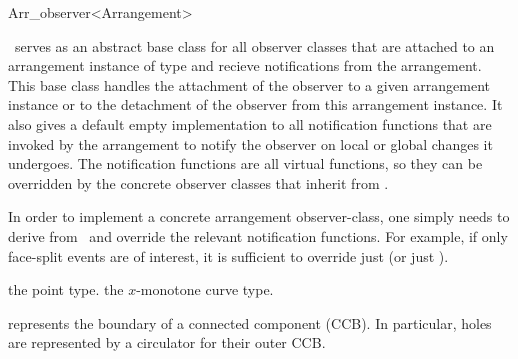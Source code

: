 
\ccRefPageBegin

\begin{ccRefClass}{Arr_observer<Arrangement>}
\label{arr_ref:arr_obs}

\ccDefinition

\ccClassTemplateName\ serves as an abstract base class for all observer
classes that are attached to an arrangement instance of type 
and recieve notifications from the arrangement.
This base class handles the attachment of the
observer to a given arrangement instance or to the detachment of the
observer from this arrangement instance. It also gives a default empty
implementation to all notification functions that are invoked by the
arrangement to notify the observer on local or global changes it undergoes.
The notification functions are all virtual functions, so they can be
overridden by the concrete observer classes that inherit from
\ccClassTemplateName.

In order to implement a concrete arrangement observer-class, one simply
needs to derive from \ccClassTemplateName\ and override the relevant
notification functions. For example, if only face-split events are of
interest, it is sufficient to override just  
(or just ).


\ccTypes


    {the point type.}
\ccGlue
{}
    {the $x$-monotone curve type.}

\ccGlue
{}
\ccGlue
{}
\ccGlue
{}
    {represents the boundary of a connected component (CCB).
     In particular, holes are represented by a circulator for their outer CCB.}


\end{ccRefClass}
